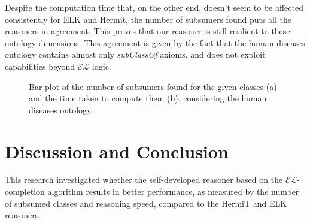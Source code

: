 \documentclass[a4paper]{article}
\theoremstyle{plain}
\theoremstyle{definition}
\begin{document}
    Despite the computation time that, on the other end, doesn't seem to be affected consistently for ELK and Hermit, the number of subsumers found puts all the reasoners in agreement. This proves that our reasoner is still resilient to these ontology dimensions. This agreement is given by the fact that the human diseases ontology contains almost only \textit{subClassOf} axioms, and does not exploit capabilities beyond $\mathcal{EL}$ logic.
    
    \begin{figure}[h!]
        \centering
        \hspace{5mm} %
        \caption{Bar plot of the number of subsumers found for the given classes (a) and the time taken to compute them (b), considering the human diseases ontology.}
        \label{fig:human-diseases}
    \end{figure}
    

     
    



 \section{Discussion and Conclusion}
 This research investigated whether the self-developed reasoner based on the $\mathcal{EL}$-completion algorithm results in better performance, as measured by the number of subsumed classes and reasoning speed, compared to the HermiT and ELK reasoners. 
 
\end{document}
